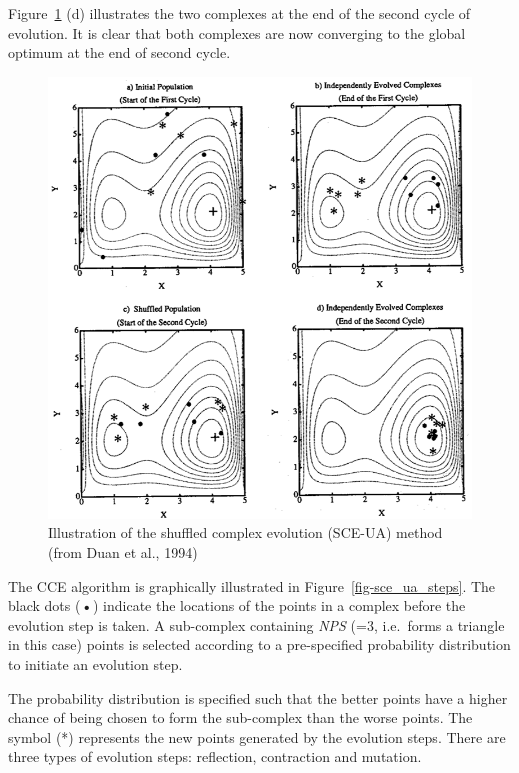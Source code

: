 \documentclass[
  letterpaper,
  DIV=11,
  numbers=noendperiod]{scrreprt}
\begin{document}
Figure~\ref{fig-sce_ua_method} (d) illustrates the two complexes at the
end of the second cycle of evolution. It is clear that both complexes
are now converging to the global optimum at the end of second cycle.

\begin{figure}

{\centering \includegraphics{./figures/fig-sce_ua_method.png}

}

\caption{\label{fig-sce_ua_method}Illustration of the shuffled complex
evolution (SCE-UA) method (from Duan et al., 1994)}

\end{figure}

The CCE algorithm is graphically illustrated in
Figure~\ref{fig-sce_ua_steps}. The black dots (\textbf{•}) indicate the
locations of the points in a complex before the evolution step is taken.
A sub-complex containing \emph{NPS} (=3, i.e.~forms a triangle in this
case) points is selected according to a pre-specified probability
distribution to initiate an evolution step.

The probability distribution is specified such that the better points
have a higher chance of being chosen to form the sub-complex than the
worse points. The symbol (*) represents the new points generated by the
evolution steps. There are three types of evolution steps: reflection,
contraction and mutation.
\end{document}
